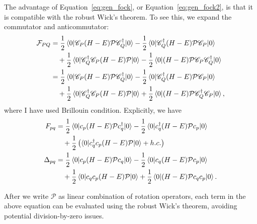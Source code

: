 \documentclass[11pt,letterpaper]{article}
\begin{document}
The advantage of Equation~\eqref{eq:gen_fock}, or Equation~\eqref{eq:gen_fock2},
is that it is compatible with  the robust Wick's theorem.
To see this, we expand the commutator and anticommutator:
\begin{subequations}
\label{eq:gen_fock3}
\begin{align}
  \mathcal{F}_{PQ}
  \nonumber
  &= \frac{1}{2} \braket{0|\mathscr{C}_P (H - E) \mathcal{P} \mathscr{C}^\dag_Q|0}
  - \frac{1}{2} \braket{0|\mathscr{C}^\dag_Q (H - E) \mathcal{P} \mathscr{C}_P|0}\\
  &\quad
  + \frac{1}{2} \braket{0|\mathscr{C}^\dag_Q \mathscr{C}_P (H - E) \mathcal{P}|0}
  - \frac{1}{2} \braket{0|(H - E) \mathcal{P} \mathscr{C}_P \mathscr{C}^\dag_Q|0}\\
  \nonumber
  &= \frac{1}{2} \braket{0|\mathscr{C}_P (H - E) \mathcal{P} \mathscr{C}^\dag_Q|0}
  - \frac{1}{2} \braket{0|\mathscr{C}^\dag_Q (H - E) \mathcal{P} \mathscr{C}_P|0}\\
  &\quad
  + \frac{1}{2} \braket{0|\mathscr{C}^\dag_Q \mathscr{C}_P (H - E) \mathcal{P}|0}
  + \frac{1}{2} \braket{0|(H - E) \mathcal{P} \mathscr{C}^\dag_Q \mathscr{C}_P|0},
\end{align}
\end{subequations}
where I have used Brillouin condition.
Explicitly, we have
\begin{subequations}
\begin{align}
  \label{eq:fock_def}
  F_{pq}
  \nonumber
  &= \frac{1}{2} \braket{0|c_p (H - E) \mathcal{P} c^\dag_q|0}
  - \frac{1}{2} \braket{0|c^\dag_q (H - E) \mathcal{P} c_p|0}\\
  &\quad+ \frac{1}{2} \left(
    \braket{0|c^\dag_q c_p (H - E) \mathcal{P}|0}
    + h.c.
  \right)\\
  \Delta_{pq}
  \nonumber
  &= \frac{1}{2} \braket{0|c_p (H - E) \mathcal{P} c_q|0}
  - \frac{1}{2} \braket{0|c_q (H - E) \mathcal{P} c_p|0}\\
  &\quad + \frac{1}{2} \braket{0|c_q c_p (H - E) \mathcal{P}|0}
  + \frac{1}{2} \braket{0|(H - E) \mathcal{P} c_q c_p|0}.
\end{align}
\end{subequations}

After we write $\mathcal{P}$ as linear combination of rotation operators, each term in
the above equation can be evaluated using the robust Wick's theorem, avoiding potential
division-by-zero issues.
 
\end{document}
